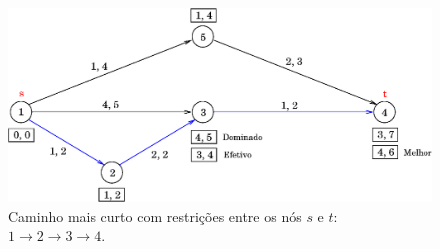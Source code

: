 \begin{figure}[htbp]
	\begin{center}
		\includegraphics[scale=0.6]{fig/shortest_path.eps}
		\caption{Caminho mais curto com restrições entre os nós $s$ e $t$: $1 \to 2 \to 3 \to 4$.}
		\label{fig:shortest_path}
	\end{center}
\end{figure}

